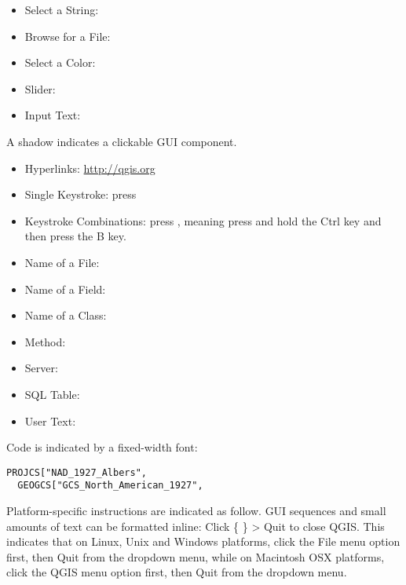 \begin{itemize}
%
\item Select a String: 
%
%
\item Browse for a File: \browsebutton 
%
\item Select a Color: 
%
\item Slider: 
%
\item Input Text: 
\end{itemize}
A shadow indicates a clickable GUI component.

\begin{itemize}
%
\item Hyperlinks: \url{http://qgis.org}
%
\item Single Keystroke: press 
\item Keystroke Combinations: press , meaning press and
hold the Ctrl key and then press the B key.
\item Name of a File: 
\item Name of a Field: 
\item Name of a Class: 
\item Method: 
\item Server: 
\item SQL Table:     
%
\item User Text: 
\end{itemize}

Code is indicated by a fixed-width font:
\begin{verbatim}
PROJCS["NAD_1927_Albers",
  GEOGCS["GCS_North_American_1927",
\end{verbatim}

Platform-specific instructions are indicated as follow.
GUI sequences and small amounts of text can be formatted inline: %
Click \{\nix{} \} > Quit to %
close QGIS. This indicates that on Linux, Unix and Windows platforms, %
click the File menu option first, then Quit from the dropdown menu, while on %
Macintosh OSX platforms, click the QGIS menu option first, then Quit from the %
dropdown menu.

